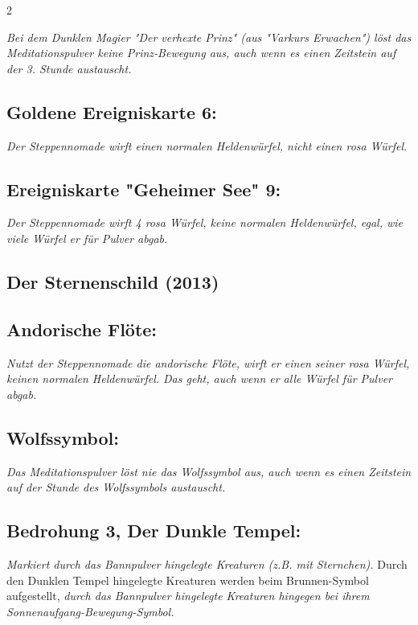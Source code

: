 \documentclass[10pt, a4paper, oneside]{book}
\newcommand{\fan}[1]{\textit{#1}}
\begin{document}
\begin{multicols*}{2}
\begin{bgcolor}
\fan{Bei dem Dunklen Magier "Der verhexte Prinz" (aus "Varkurs Erwachen") löst das Meditationspulver keine Prinz-Bewegung aus, auch wenn es einen Zeitstein auf der 3. Stunde austauscht.}


\subsection{Goldene Ereigniskarte 6:}

\fan{Der Steppennomade wirft einen normalen Heldenwürfel, nicht einen rosa Würfel.}



\subsection{Ereigniskarte "Geheimer See" 9:}

\fan{Der Steppennomade wirft 4 rosa Würfel, keine normalen Heldenwürfel, egal, wie viele Würfel er für Pulver abgab.}



\end{bgcolor}


\begin{bgcolor}
\section{Der Sternenschild (2013)}

\subsection{Andorische Flöte:}

\fan{Nutzt der Steppennomade die andorische Flöte, wirft er einen seiner rosa Würfel, keinen normalen Heldenwürfel. Das geht, auch wenn er alle Würfel für Pulver abgab.}

\subsection{Wolfssymbol:}

\fan{Das Meditationspulver löst nie das Wolfssymbol aus, auch wenn es einen Zeitstein auf der Stunde des Wolfssymbols austauscht.}


\subsection{Bedrohung 3, Der Dunkle Tempel:}

\fan{Markiert durch das Bannpulver hingelegte Kreaturen (z.B. mit Sternchen).} Durch den Dunklen Tempel hingelegte Kreaturen werden beim Brunnen-Symbol aufgestellt, \fan{durch das Bannpulver hingelegte Kreaturen hingegen bei ihrem Sonnenaufgang-Bewegung-Symbol.}



\end{bgcolor}
\end{multicols*}
\end{document}
